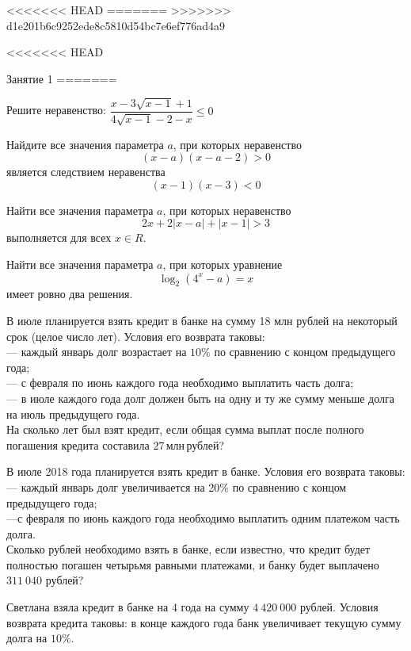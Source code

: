 <<<<<<< HEAD
=======
%
%
>>>>>>> d1e201b6c9252ede8c5810d54bc7e6ef776ad4a9

\begin{class}[number=1]
	\begin{listofex}
<<<<<<< HEAD
		\item Занятие 1
=======
		\item Решите неравенство: \(  \dfrac{x-3\sqrt{x-1}+1}{4\sqrt{x-1}-2-x}\le0 \)
		\item Найдите все значения параметра \( a \), при которых неравенство
		\[ (x-a)(x-a-2)>0 \]
		является следствием неравенства
		\[ (x-1)(x-3)<0 \]
		\item Найти все значения параметра \( a \), при которых неравенство
		\[ 2x+2|x-a|+|x-1| > 3 \]
		выполняется для всех \( x\in R \).
		\item Найти все значения параметра \( a \), при которых уравнение
		\[ \log_2(4^x-a)=x \]
		имеет ровно два решения.
		\item В июле планируется взять кредит в банке на сумму 18 млн рублей на некоторый срок (целое число лет).
		Условия его возврата таковы:\\
		--- каждый январь долг возрастает на \( 10\% \) по сравнению с концом предыдущего года;\\
		--- с февраля по июнь каждого года необходимо выплатить часть долга;\\
		--- в июле каждого года долг должен быть на одну и ту же сумму меньше долга на июль предыдущего года.\\
		На сколько лет был взят кредит, если общая сумма выплат после полного погашения кредита составила \( 27 \) млн рублей?
		\item В июле 2018 года планируется взять кредит в банке. Условия его возврата таковы:\\
		--- каждый январь долг увеличивается на 20\% по сравнению с концом предыдущего года;\\
		---с февраля по июнь каждого года необходимо выплатить одним платежом часть долга.\\
		Сколько рублей необходимо взять в банке, если известно,
		что кредит будет полностью погашен четырьмя равными платежами,
		и банку будет выплачено \( 311\:040 \) рублей?
		\item Светлана взяла кредит в банке на 4 года на сумму \( 4\:420\:000 \) рублей.
		Условия возврата кредита таковы: в конце каждого года банк увеличивает текущую сумму долга на \( 10\% \).

\end{listofex}
\end{class}
